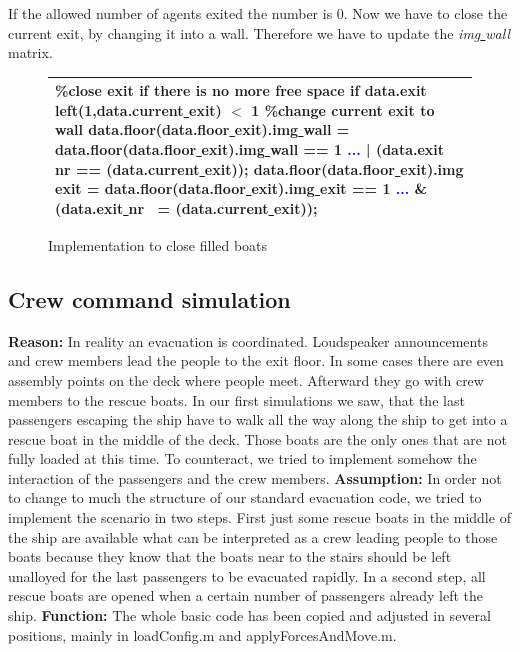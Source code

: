 \documentclass[11pt]{article}
\begin{document}
If the allowed number of agents exited the number is 0. Now we have to close the current exit, by changing it into a wall. Therefore we have to update the \textit{img\underline{ }wall} matrix.
\begin{figure}[h!]
\centering
\begin{tabular}
{|>{\large}m{\textwidth}|} \hline
\bigskip
\textcolor{commentcolor}{\%close exit if there is no more free space}
\newline
\textcolor{keywordcolor}{if} data.exit\underline{ } left(1,data.current\underline{ }exit) $<$ 1
\newline
\textcolor{commentcolor}{\%change current exit to wall}
\newline
data.floor(data.floor\underline{ }exit).img\underline{ }wall = data.floor(data.floor\underline{ }exit).img\underline{ }wall == 1 \textcolor{blue}{...}
\newline
| (data.exit\underline{ }nr == (data.current\underline{ }exit));
\newline
data.floor(data.floor\underline{ }exit).img\underline{ }exit = data.floor(data.floor\underline{ }exit).img\underline{ }exit == 1 \textcolor{blue}{...}
\newline
\& (data.exit\underline{ }nr ~= (data.current\underline{ }exit));
\bigskip
\\ \hline
\end{tabular}
\caption{Implementation to close filled  boats}
\end{figure}


\subsection{Crew command simulation}
\textbf{Reason:}
\newline 
In reality an evacuation is coordinated. Loudspeaker announcements and crew members lead the people to the exit floor. In some cases there are even assembly points on the deck where people meet. Afterward they go with crew members to the rescue boats.
In our first simulations we saw, that the last passengers escaping the ship have to walk all the way along the ship to get into a rescue boat in the middle of the deck. Those boats are the only ones that are not fully loaded at this time. To counteract, we tried to implement somehow the interaction of the passengers and the crew members. 
\newline
\textbf{Assumption:}
\newline 
In order not to change to much the structure of our standard evacuation code, we tried to implement the scenario in two steps. First just some rescue boats in the middle of the ship are available what can be interpreted as a crew leading people to those boats because they know that the boats near to the stairs should be left unalloyed for the last passengers to be evacuated rapidly. In a second step, all rescue boats are opened when a certain number of passengers already left the ship.
 \newline
\textbf{Function:}
\newline 
The whole basic code has been copied and adjusted in several positions, mainly in loadConfig.m and applyForcesAndMove.m.
\end{document}
